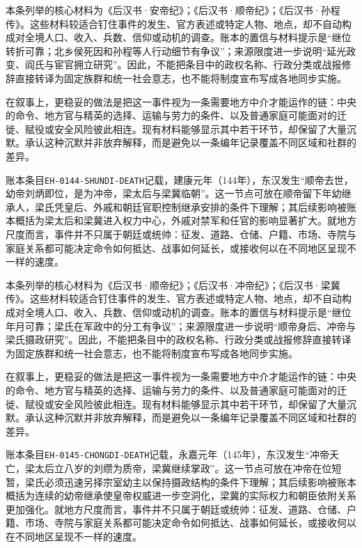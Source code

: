 本条列举的核心材料为《后汉书·安帝纪》；《后汉书·顺帝纪》；《后汉书·孙程传》。这些材料较适合钉住事件的发生、官方表述或特定人物、地点，却不自动构成对全境人口、收入、兵数、信仰或动机的调查。账本的置信与材料提示是“继位转折可靠；北乡侯死因和孙程等人行动细节有争议”；来源限度进一步说明“延光政变、阎氏与宦官拥立研究”。因此，不能把条目中的政权名称、行政分类或战报修辞直接转译为固定族群和统一社会意志，也不能将制度宣布写成各地同步实施。

在叙事上，更稳妥的做法是把这一事件视为一条需要地方中介才能运作的链：中央的命令、地方官与精英的选择、运输与劳力的条件、以及普通家庭可能面对的迁徙、赋役或安全风险彼此相连。现有材料能够显示其中若干环节，却保留了大量沉默。承认这种沉默并非放弃解释，而是避免以一条编年记录覆盖不同区域和社群的差异。

账本条目\texttt{EH-0144-SHUNDI-DEATH}记载，建康元年（144年），东汉发生“顺帝去世，幼帝刘炳即位，是为冲帝，梁太后与梁冀临朝”。这一节点可放在顺帝留下年幼继承人，梁氏凭皇后、外戚和朝廷官职控制继承安排的条件下理解；其后续影响被账本概括为梁太后和梁冀进入权力中心，外戚对禁军和任官的影响显著扩大。就地方尺度而言，事件并不只属于朝廷或统帅：征发、道路、仓储、户籍、市场、寺院与家庭关系都可能决定命令如何抵达、战事如何延长，或接收何以在不同地区呈现不一样的速度。

本条列举的核心材料为《后汉书·顺帝纪》；《后汉书·冲帝纪》；《后汉书·梁冀传》。这些材料较适合钉住事件的发生、官方表述或特定人物、地点，却不自动构成对全境人口、收入、兵数、信仰或动机的调查。账本的置信与材料提示是“继位年月可靠；梁氏在军政中的分工有争议”；来源限度进一步说明“顺帝身后、冲帝与梁氏摄政研究”。因此，不能把条目中的政权名称、行政分类或战报修辞直接转译为固定族群和统一社会意志，也不能将制度宣布写成各地同步实施。

在叙事上，更稳妥的做法是把这一事件视为一条需要地方中介才能运作的链：中央的命令、地方官与精英的选择、运输与劳力的条件、以及普通家庭可能面对的迁徙、赋役或安全风险彼此相连。现有材料能够显示其中若干环节，却保留了大量沉默。承认这种沉默并非放弃解释，而是避免以一条编年记录覆盖不同区域和社群的差异。

账本条目\texttt{EH-0145-CHONGDI-DEATH}记载，永嘉元年（145年），东汉发生“冲帝夭亡，梁太后立八岁的刘缵为质帝，梁冀继续掌政”。这一节点可放在冲帝在位短暂，梁氏必须迅速另择宗室幼主以保持摄政结构的条件下理解；其后续影响被账本概括为连续的幼帝继承使皇帝权威进一步空洞化，梁冀的实际权力和朝臣依附关系更加强化。就地方尺度而言，事件并不只属于朝廷或统帅：征发、道路、仓储、户籍、市场、寺院与家庭关系都可能决定命令如何抵达、战事如何延长，或接收何以在不同地区呈现不一样的速度。

